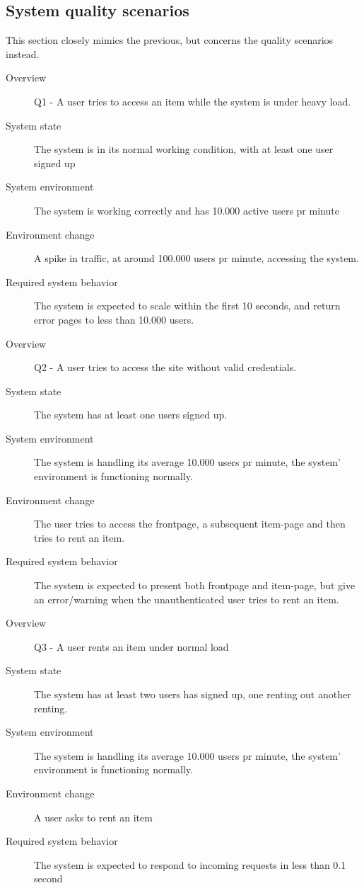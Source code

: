 \subsection{System quality scenarios}
\label{sec:syst-qual-scen}
This section closely mimics the previous, but concerns the quality scenarios
instead.

\begin{description}
    \item[Overview] Q1 - A user tries to access an item while the system is
        under heavy load.
    \item[System state] The system is in its normal working condition, with at
        least one user signed up
    \item[System environment] The system is working correctly and has 10.000
        active users pr minute
    \item[Environment change] A spike in traffic, at around 100.000 users pr
        minute, accessing the system.
    \item[Required system behavior] The system is expected to scale within the
        first 10 seconds, and return error pages to less than 10.000 users.
\end{description}

\begin{description}
    \item[Overview] Q2 - A user tries to access the site without valid
        credentials.
    \item[System state] The system has at least one users signed up.
    \item[System environment] The system is handling its average 10.000 users pr
        minute, the system' environment is functioning normally.
    \item[Environment change] The user tries to access the frontpage, a
        subsequent item-page and then tries to rent an item.
    \item[Required system behavior] The system is expected to present both
        frontpage and item-page, but give an error/warning when the
        unauthenticated user tries to rent an item.
\end{description}

\begin{description}
    \item[Overview] Q3 - A user rents an item under normal load
    \item[System state] The system has at least two users has signed up, one
        renting out another renting.
    \item[System environment] The system is handling its average 10.000 users pr
        minute, the system' environment is functioning normally.
    \item[Environment change] A user asks to rent an item
    \item[Required system behavior] The system is expected to respond to
        incoming requests in less than 0.1 second
\end{description}

